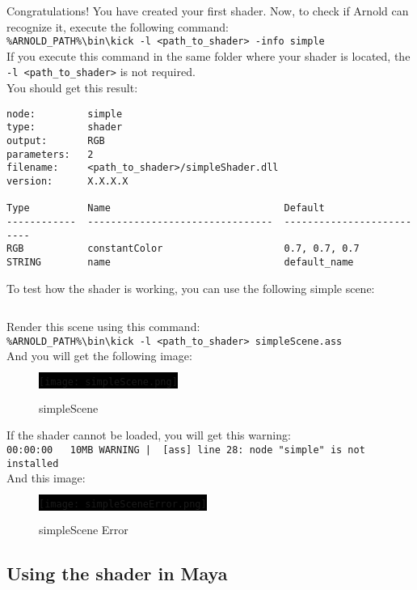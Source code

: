 Congratulations! You have created your first shader. Now, to check if Arnold can recognize it, execute the following command:\\
\verb|%ARNOLD_PATH%\bin\kick -l <path_to_shader> -info simple|\\
If you execute this command in the same folder where your shader is located, the \verb|-l <path_to_shader>| is not required.\\

You should get this result:
{\footnotesize \begin{verbatim}
node:         simple
type:         shader
output:       RGB
parameters:   2
filename:     <path_to_shader>/simpleShader.dll
version:      X.X.X.X

Type          Name                              Default
------------  --------------------------------  --------------------------
RGB           constantColor                     0.7, 0.7, 0.7
STRING        name                              default_name
\end{verbatim}}


To test how the shader is working, you can use the following simple scene:

\inputminted[mathescape,
linenos,
numbersep=5pt,
frame=lines,
framesep=2mm,
baselinestretch=1,
fontsize=\footnotesize,
tabsize=3,
label=simpleScene.ass]
{ass}{simpleScene.ass}

Render this scene using this command:\\
\verb|%ARNOLD_PATH%\bin\kick -l <path_to_shader> simpleScene.ass|\\

And you will get the following image:
\begin{figure}[H]
\centering
\colorbox{black}{\texttt{[image: simpleScene.png]}}
\caption{simpleScene}
\label{simpleScene.png}
\end{figure}

If the shader cannot be loaded, you will get this warning:\\
{\footnotesize \verb=00:00:00   10MB WARNING |  [ass] line 28: node "simple" is not installed=}\\
And this image:
\begin{figure}[H]
\centering
\colorbox{black}{\texttt{[image: simpleSceneError.png]}}
\caption{simpleScene Error}
\label{simpleSceneError.png}
\end{figure}

\subsection{Using the shader in Maya}
